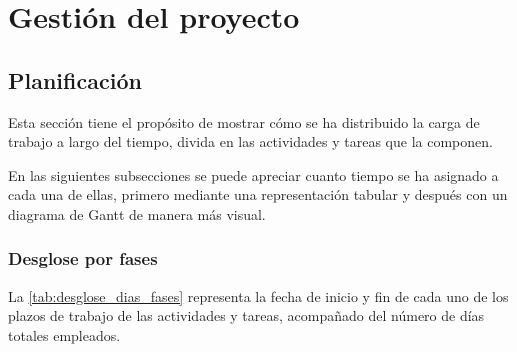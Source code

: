 \chapter{Gestión del proyecto}
\label{ch:gestion}
\section{Planificación}\label{sec:planificacion}
Esta sección tiene el propósito de mostrar cómo se ha distribuido la carga de trabajo a largo del tiempo, divida en las actividades y tareas que la componen.

En las siguientes subsecciones se puede apreciar cuanto tiempo se ha asignado a cada una de ellas, primero mediante una representación tabular y después con un diagrama de Gantt de manera más visual.

\subsection{Desglose por fases}\label{subsec:desglose_fases}
La \autoref{tab:desglose_dias_fases} representa la fecha de inicio y fin de cada uno de los plazos de trabajo de las actividades y tareas, acompañado del número de días totales empleados.

